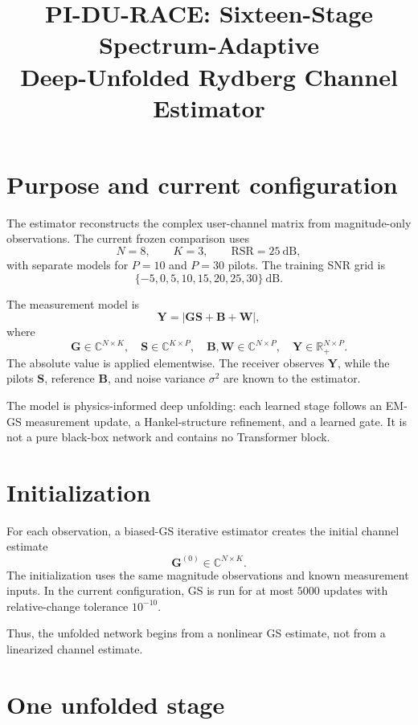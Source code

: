 ﻿\documentclass[11pt,a4paper]{article}
\title{PI-DU-RACE: Sixteen-Stage Spectrum-Adaptive\\
Deep-Unfolded Rydberg Channel Estimator}
\author{}
\date{}
\begin{document}
\maketitle

\section{Purpose and current configuration}

The estimator reconstructs the complex user-channel matrix from
magnitude-only observations. The current frozen comparison uses
\[
N=8,\qquad K=3,\qquad \mathrm{RSR}=25~\mathrm{dB},
\]
with separate models for \(P=10\) and \(P=30\) pilots. The training
SNR grid is
\[
\{-5,0,5,10,15,20,25,30\}~\mathrm{dB}.
\]

The measurement model is
\begin{equation}
\bm{Y}
=
\left|\bm{G}\bm{S}+\bm{B}+\bm{W}\right|,
\end{equation}
where
\[
\bm{G}\in\mathbb{C}^{N\times K},\quad
\bm{S}\in\mathbb{C}^{K\times P},\quad
\bm{B},\bm{W}\in\mathbb{C}^{N\times P},\quad \bm{Y}\in\mathbb{R}_{+}^{N\times P}.
\]
The absolute value is applied elementwise. The receiver observes
\(\bm{Y}\), while the pilots \(\bm{S}\), reference \(\bm{B}\), and noise
variance \(\sigma^2\) are known to the estimator.

The model is physics-informed deep unfolding: each learned stage follows
an EM-GS measurement update, a Hankel-structure refinement, and a learned
gate. It is not a pure black-box network and contains no Transformer
block.



\section{Initialization}

For each observation, a biased-GS iterative estimator creates the initial
channel estimate
\[
\bm{G}^{(0)}\in\mathbb{C}^{N\times K}.
\]
The initialization uses the same magnitude observations and known
measurement inputs. In the current configuration, GS is run for at most
\(5000\) updates with relative-change tolerance \(10^{-10}\).

Thus, the unfolded network begins from a nonlinear GS estimate, not from
a linearized channel estimate.

\section{One unfolded stage}
\end{document}
